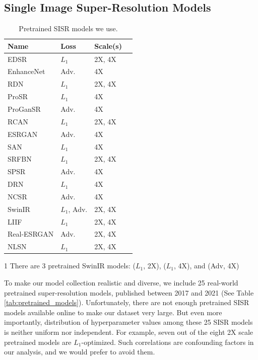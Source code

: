 \documentclass[10pt]{article} %
\begin{document}
\subsection{Single Image Super-Resolution Models}
\label{sec:SISR_dataset}
\begin{table}
    \centering
    \vspace{-2em}
    \caption{Pretrained SISR models we use. }
    \label{tab:pretrained_models}
    \begin{threeparttable}

    \begin{tabular}{l l l l}
         \toprule
         Name & Loss  & Scale(s)  \\
         \midrule
        EDSR & $L_1$ & 2X, 4X \\
        EnhanceNet & Adv. & 4X \\
        RDN & $L_1$ & 2X, 4X \\
        ProSR & $L_1$ & 4X \\
        ProGanSR & Adv. & 4X\\
        RCAN & $L_1$ & 2X, 4X\\
        ESRGAN& Adv. & 4X\\
        SAN & $L_1$ & 4X\\
        SRFBN & $L_1$ & 2X, 4X \\
        SPSR & Adv. & 4X \\
        DRN & $L_1$ & 4X \\
        NCSR & Adv. & 4X \\
        SwinIR \tnote{1} & $L_1$, Adv. & 2X, 4X \\
        LIIF & $L_1$ & 2X, 4X \\
        Real-ESRGAN & Adv. & 2X, 4X  \\
        NLSN & $L_1$ & 2X, 4X \\
        \bottomrule
    \end{tabular}
    \begin{tablenotes}
    \item[1] There are 3 pretrained SwinIR models: ($L_1$, 2X), ($L_1$, 4X), and (Adv, 4X)
    \end{tablenotes}

    \end{threeparttable}
    \label{tab:pretrained_sisr_methods}
\end{table}

To make our model collection realistic and diverse, we include 25 real-world pretrained super-resolution models, published between 2017 and 2021 (See Table \ref{tab:pretrained_models}). Unfortunately, there are not enough pretrained SISR models available online to make our dataset very large. But even more importantly, distribution of hyperparameter values among these 25 SISR models is neither uniform nor independent. For example, seven out of the eight 2X scale pretrained models are $L_1$-optimized. Such correlations are confounding factors in our analysis, and we would prefer to avoid them.
\end{document}
